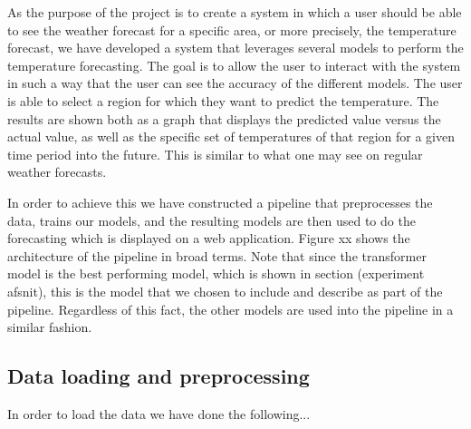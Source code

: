 As the purpose of the project is to create a system in which a user should be able to see the weather forecast for a specific area, or more precisely, the temperature forecast, we have developed a system that leverages several models to perform the temperature forecasting. 
The goal is to allow the user to interact with the system in such a way that the user can see the accuracy of the different models. 
The user is able to select a region for which they want to predict the temperature. The results are shown both as a graph that displays the predicted value versus the actual value, as well as the specific set of temperatures of that region for a given time period into the future. This is similar to what one may see on regular weather forecasts.

In order to achieve this we have constructed a pipeline that preprocesses the data, trains our models, and the resulting models are then used to do the forecasting which is displayed on a web application. 
Figure xx shows the architecture of the pipeline in broad terms. 
Note that since the transformer model is the best performing model, which is shown in section (experiment afsnit), this is the model that we chosen to include and describe as part of the pipeline. Regardless of this fact, the other models are used into the pipeline in a similar fashion.

\subsection{Data loading and preprocessing}
In order to load the data we have done the following...
